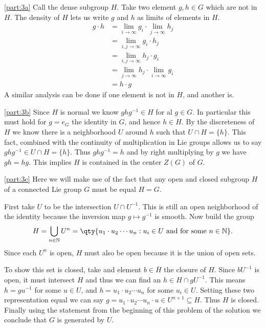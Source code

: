 \documentclass[
	pages,
	boxes,
	color=WildStrawberry
]{homework}
\begin{document}
\begin{solution}
	\ref{part:3a}
	Call the dense subgroup $H$. Take two element $g, h\in G$ which are not in $H$. The density of $H$ lets us write $g$ and $h$ as limits of elements in $H$.
	\begin{align*}
		g\cdot h & = \lim_{i\to\infty} g_i \cdot \lim_{j\to\infty} h_j \\
		         & = \lim_{i,j\to\infty}g_i\cdot h_j                   \\
		         & = \lim_{i,j\to\infty}h_j\cdot g_i                   \\
		         & = \lim_{j\to\infty}h_j\cdot\lim_{i\to\infty}g_i     \\
		         & = h\cdot g
	\end{align*}
	A similar analysis can be done if one element is not in $H$, and another is.

	\ref{part:3b}
	Since $H$ is normal we know $ghg^{-1}\in H$ for al $g\in G$. In particular this must hold for $g = e_G$ the identity in $G$, and hence $h\in H$. By the discreteness of $H$ we know there is a neighborhood $U$ around $h$ such that $U\cap H = \{h\}$. This fact, combined with the continuity of multiplication in Lie groups allows us to say $ghg^{-1}\in U\cap H = \{h\}$. Thus $ghg^{-1} = h$ and by right multiplying by $g$ we have $gh = hg$. This implies $H$ is contained in the center $Z(G)$ of $G$.

	\ref{part:3c}
	Here we will make use of the fact that any open and closed subgroup $H$ of a connected Lie group $G$ must be equal $H = G$.

	First take $U$ to be the intersection $U\cap U^{-1}$. This is still an open neighborhood of the identity because the inversion map $g\mapsto g^{-1}$ is smooth. Now build the group
	\begin{equation*}
		H = \bigcup_{n\in\N}U^n = \qty{u_1\cdot u_2\cdots u_n : u_i\in U \text{ and for some }n\in\N}.
	\end{equation*}
	Since each $U^n$ is open, $H$ must also be open because it is the union of open sets.

	To show this set is closed, take and element $b\in\overline{H}$ the closure of $H$. Since $bU^{-1}$ is open, it must intersect $H$ and thus we can find an $h\in H\cap gU^{-1}$. This means $h = gu^{-1}$ for some $u\in U$, and $h = u_1\cdot u_2\cdots u_n$ for some $u_i\in U$. Setting these two representation equal we can say $g = u_1\cdot u_2\cdots u_n\cdot u\in U^{n+1}\subseteq H$. Thus $H$ is closed. Finally using the statement from the beginning of this problem of the solution we conclude that $G$ is generated by $U$.
\end{solution}
\end{document}
